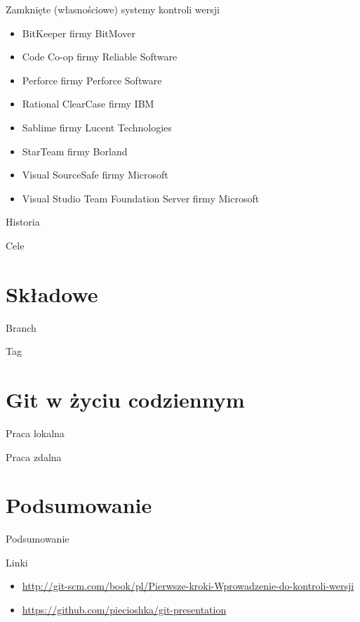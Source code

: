\documentclass{beamer}
\begin{document}
\begin{frame}{Zamknięte (własnościowe) systemy kontroli wersji}
\begin{itemize}
	\item BitKeeper firmy BitMover
	\item Code Co-op firmy Reliable Software
	\item Perforce firmy Perforce Software
	\item Rational ClearCase firmy IBM
	\item Sablime firmy Lucent Technologies
	\item StarTeam firmy Borland
	\item Visual SourceSafe firmy Microsoft
	\item Visual Studio Team Foundation Server firmy Microsoft
\end{itemize}
\end{frame}

\begin{frame}{Historia}
\end{frame}

\begin{frame}{Cele}
\end{frame}


\section{Składowe}

\begin{frame}{Branch}
\end{frame}

\begin{frame}{Tag}
\end{frame}


\section{Git w życiu codziennym}

\begin{frame}{Praca lokalna}
\end{frame}

\begin{frame}{Praca zdalna}
\end{frame}


\section{Podsumowanie}

\begin{frame}{Podsumowanie}
\end{frame}

\begin{frame}{Linki}
\begin{itemize}
  \item \url{http://git-scm.com/book/pl/Pierwsze-kroki-Wprowadzenie-do-kontroli-wersji}
  \item \url{https://github.com/piecioshka/git-presentation}
\end{itemize}
\end{frame}
\end{document}
